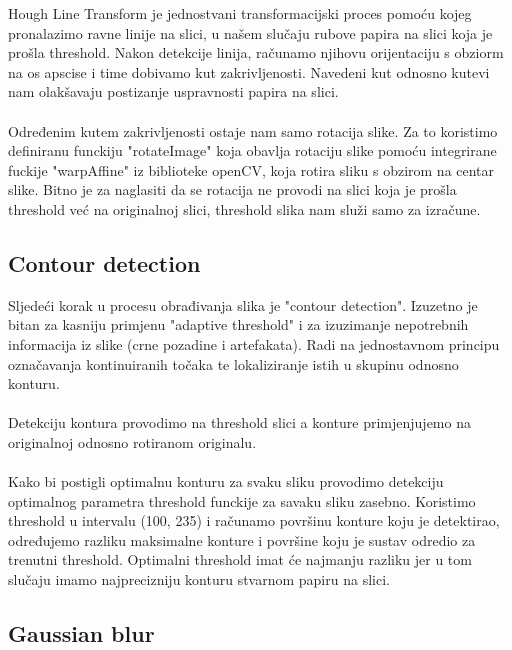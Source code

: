 \documentclass{article}
\begin{document}
Hough Line Transform je jednostvani transformacijski proces pomoću kojeg pronalazimo ravne linije na slici, u našem slučaju rubove papira na slici koja je prošla threshold. Nakon detekcije linija, računamo njihovu orijentaciju s obziorm na os apscise i time dobivamo kut zakrivljenosti. Navedeni kut odnosno kutevi nam olakšavaju postizanje uspravnosti papira na slici.\\ \\
Određenim kutem zakrivljenosti ostaje nam samo rotacija slike. Za to koristimo definiranu funckiju "rotateImage" koja obavlja rotaciju slike pomoću integrirane fuckije "warpAffine" iz biblioteke openCV, koja rotira sliku s obzirom na centar slike. %
Bitno je za naglasiti da se rotacija ne provodi na slici koja je prošla threshold već na originalnoj slici, threshold slika nam služi samo za izračune.

\subsection{Contour detection}
Sljedeći korak u procesu obrađivanja slika je "contour detection". Izuzetno je bitan za kasniju primjenu "adaptive threshold" i za izuzimanje nepotrebnih informacija iz slike (crne pozadine i artefakata). Radi na jednostavnom principu označavanja kontinuiranih točaka te lokaliziranje istih u skupinu odnosno konturu.\\ \\
Detekciju kontura provodimo na threshold slici a konture primjenjujemo na originalnoj odnosno rotiranom originalu.\\ %
\\
Kako bi postigli optimalnu konturu za svaku sliku provodimo detekciju optimalnog parametra threshold funckije za savaku sliku zasebno.
Koristimo threshold u intervalu (100, 235) i računamo površinu konture koju je detektirao, određujemo razliku maksimalne konture i površine koju je sustav odredio za trenutni threshold. Optimalni threshold imat će najmanju razliku jer u tom slučaju imamo najprecizniju konturu stvarnom papiru na slici.

\newpage

\subsection{Gaussian blur}
\end{document}
